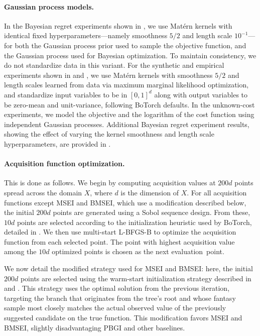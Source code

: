 \documentclass{article}
\begin{document}
\paragraph*{Gaussian process models.}
In the Bayesian regret experiments shown in , we use Matérn kernels with identical fixed hyperparameters---namely smoothness $5/2$ and length scale $10^{-1}$---for both the Gaussian process prior used to sample the objective function, and the Gaussian process used for Bayesian optimization.
To maintain consistency, we do not standardize data in this variant.
For the synthetic and empirical experiments shown in  and , we use Matérn kernels with smoothness $5/2$ and length scales learned from data via maximum marginal likelihood optimization, and standardize input variables to be in $[0,1]^d$ along with output variables to be zero-mean and unit-variance, following BoTorch defaults.
In the unknown-cost experiments, we model the objective and the logarithm of the cost function using independent Gaussian processes.
Additional Bayesian regret experiment results, showing the effect of varying the kernel smoothness and length scale hyperparameters, are provided in .

\paragraph*{Acquisition function optimization.}
This is done as follows.
We begin by computing acquisition values at $200d$ points spread across the domain $X$, where $d$ is the dimension of $X$.
For all acquisition functions except MSEI and BMSEI, which use a modification described below, the initial $200d$ points are generated using a Sobol sequence design.
From these, $10d$ points are selected according to the initialization heuristic used by BoTorch, detailed in \textcite[Appendix F.1]{balandat2020botorch}. 
We then use multi-start L-BFGS-B to optimize the acquisition function from each selected point. 
The point with highest acquisition value among the $10d$ optimized points is chosen as the next evaluation~point.

We now detail the modified strategy used for MSEI and BMSEI: here, the initial $200d$ points are selected using the warm-start initialization strategy described in \textcite[Appendix D]{jiang2020efficient} and \textcite[Appendix F]{astudillo2021multi}. 
This strategy uses the optimal solution from the previous iteration, targeting the branch that originates from the tree's root and whose fantasy sample most closely matches the actual observed value of the previously suggested candidate on the true function.
This modification favors MSEI and BMSEI, slightly disadvantaging PBGI and other baselines.
\end{document}
